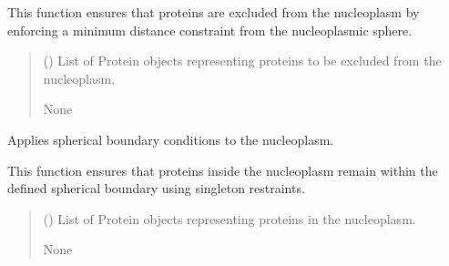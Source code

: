 \documentclass[letterpaper,10pt,english]{sphinxmanual}
\begin{document}
\begin{fulllineitems}
\begin{fulllineitems}
\sphinxAtStartPar
This function ensures that proteins are excluded from the nucleoplasm by
enforcing a minimum distance constraint from the nucleoplasmic sphere.
\begin{quote}\begin{description}
\sphinxAtStartPar
{} () \textendash{} List of Protein objects representing proteins to be excluded from the nucleoplasm.

\sphinxAtStartPar
None

\end{description}\end{quote}

\end{fulllineitems}


\begin{fulllineitems}
\label{\detokenize{src:src.System_Class.System.apply_nucleoplasm_sphere_boundary_conditions}}
\pysigstartsignatures
{}
\pysigstopsignatures
\sphinxAtStartPar
Applies spherical boundary conditions to the nucleoplasm.

\sphinxAtStartPar
This function ensures that proteins inside the nucleoplasm remain within the
defined spherical boundary using singleton restraints.
\begin{quote}\begin{description}
\sphinxAtStartPar
{} () \textendash{} List of Protein objects representing proteins in the nucleoplasm.

\sphinxAtStartPar
None

\end{description}\end{quote}

\end{fulllineitems}



\end{fulllineitems}
\end{document}
